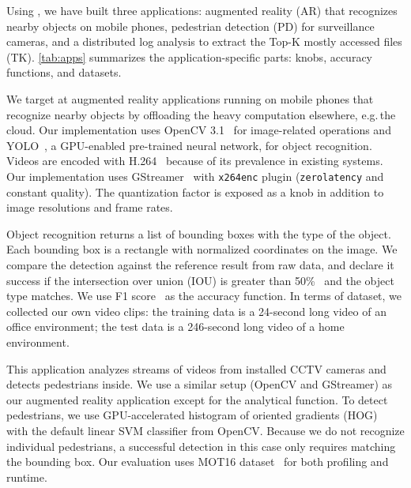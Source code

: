 Using \sysname{}, we have built three applications: augmented reality (AR) that
recognizes nearby objects on mobile phones, pedestrian detection (PD) for
surveillance cameras, and a distributed log analysis to extract the Top-K mostly
accessed files (TK). \autoref{tab:apps} summarizes the application-specific
parts: knobs, accuracy functions, and datasets.

 We target at augmented reality applications running on
mobile phones that recognize nearby objects by offloading the heavy computation
elsewhere, e.g.\,the cloud. Our implementation uses OpenCV
3.1~\cite{opencvlibrary} for image-related operations and YOLO~\cite{darknet13,
  redmon2016yolo9000}, a GPU-enabled pre-trained neural network, for object
recognition. Videos are encoded with H.264~\cite{richardson2011h} because of its
prevalence in existing systems. Our implementation uses
GStreamer~\cite{gstreamer} with \texttt{x264enc} plugin (\texttt{zerolatency}
and constant quality). The quantization factor is exposed as a knob in addition
to image resolutions and frame rates.

Object recognition returns a list of bounding boxes with the type of the
object. Each bounding box is a rectangle with normalized coordinates on the
image. We compare the detection against the reference result from raw data, and
declare it success if the intersection over union (IOU) is greater than
50\%~\cite{everingham2010pascal} and the object type matches. We use F1
score~\cite{Rijsbergen:1979:IR:539927} as the accuracy function. In terms of
dataset, we collected our own video clips: the training data is a 24-second long
video of an office environment; the test data is a 246-second long video of a
home environment.

 This application analyzes streams of videos from
installed CCTV cameras and detects pedestrians inside. We use a similar setup
(OpenCV and GStreamer) as our augmented reality application except for the
analytical function. To detect pedestrians, we use GPU-accelerated histogram of
oriented gradients (HOG)~\cite{dalal2005histograms} with the default linear SVM
classifier from OpenCV. Because we do not recognize individual pedestrians, a
successful detection in this case only requires matching the bounding box. Our
evaluation uses MOT16 dataset~\cite{milan2016mot16} for both profiling and
runtime.

